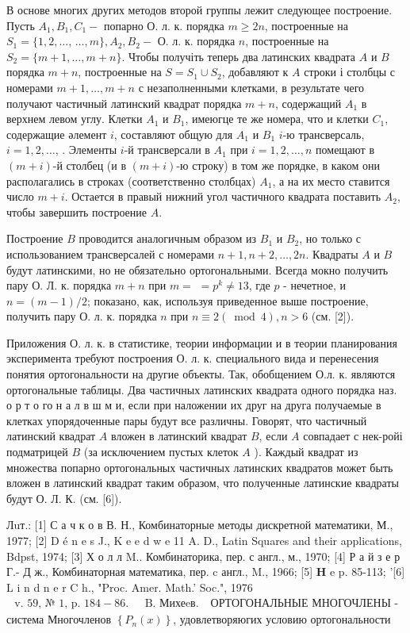 \documentclass[10pt]{article}
\begin{document}
В основе многих других методов второй группы лежит следующее построение. Пусть $A_{1}, B_{1}, C_{1}-$ попарно О. л. к. порядка $m \geqslant 2 n$, построенные на $S_{1}=\{1,2, \ldots$, $\ldots, m\}, A_{2}, B_{2}-$ О. л. к. порядка $n$, построенные на $S_{2}=\{m+1, \ldots, m+n\}$. Чтобы получіть теперь два латинских квадрата $A$ и $B$ порядка $m+n$, построенные на $S=S_{1} \cup S_{2}$, добавляют к $A$ строки і столбцы с номерами $m+1, \ldots, m+n$ с незаполненными клетками, в результате чего получают частичный латинский квадрат порядка $m+n$, содержащий $A_{1}$ в верхнем левом углу. Клетки $A_{1}$ и $B_{1}$, имеюгце те же номера, что и клетки $C_{1}$, содержащие әлемент $i$, составляют общую для $A_{1}$ и $B_{1}$ $i$-ю трансверсаль, $i=1,2, \ldots$, . Элементы $i$-й трансверсали в $A_{1}$ при $i=1,2, \ldots, n$ помещают в $(m+i)$-й столбец (и в $(m+i)$-ю строку) в том же порядке, в каком они располагались в строках (соответственно столбцах) $A_{1}$, а на их место ставится число $m+i$. Остается в правый нижний угол частичного квадрата поставить $A_{2}$, чтобы завершить построение $A$.



Построение $B$ проводится аналогичным образом из $B_{1}$ и $B_{2}$, но только с использованием трансверсалей с номерами $n+1, n+2, \ldots, 2 n$. Квадраты $A$ и $B$ будут латинскими, но не обязательно ортогональными. Всегда мокно получить пару О. Л. к. порядка $m+n$ при $m=$ $=p^{k} \neq 13$, где $p$ - нечетное, и $n=(m-1) / 2$; показано, как, используя приведенное выше построение, получить пару О. л. к. порядка $n$ при $n \equiv 2(\bmod 4), n>6$ (см. [2]).



Приложения О. л. к. в статистике, теории информации и в теории планирования эксперимента требуют построения О. л. к. специального вида и перенесения понятия ортогональности на другие объекты. Так, обобщением О.л. к. являются ортогональные таблицы. Два частичных латинских квадрата одного порядка наз. о р т о го н а л в ш м и, если при наложении их друг на друга получаемые в клетках упорядоченные пары будут все различны. Говорят, что частичный латинский квадрат $A$ вложен в латинский квадрат $B$, если $A$ совпадает с нек-ройі подматрицей $B$ (за исключением пустых клеток $A$ ). Каждый квадрат из множества попарно ортогональных частичных латинских квадратов может быть вложен в латинский квадрат таким образом, что полученные латинские квадраты будут О. Л. К. (см. [6]).



Лuт.: [1] С а ч к о в В. Н., Комбинаторные методы дискретной математики, М., 1977; [2] D é n e s J., K e e d w e 11 A. D., Latin Squares and their applications, Bdpst, 1974; [3] Х о л л M.. Комбинаторика, пер. с англ., м., 1970; [4] Р а й з е р Г.- Д ж., Комбинаторная математика, пер. c англ., M., 1966; [5] $\mathbf{H}$ e p. 85-113; '[6] L i n d n e r C h., "Proc. Amer. Math.' Soc.", 1976 $\begin{array}{ll}\text { v. } 59 \text {, № 1, p. } 184-86 \text {. } & \text { B. Михеeв. }\end{array}$ ОРТОГОНАЛЬНЫЕ МНОГОЧЛЕНЫ - система Многочленов $\left\{P_{n}(x)\right\}$, удовлетворяюгих условию ортогональности
\end{document}

